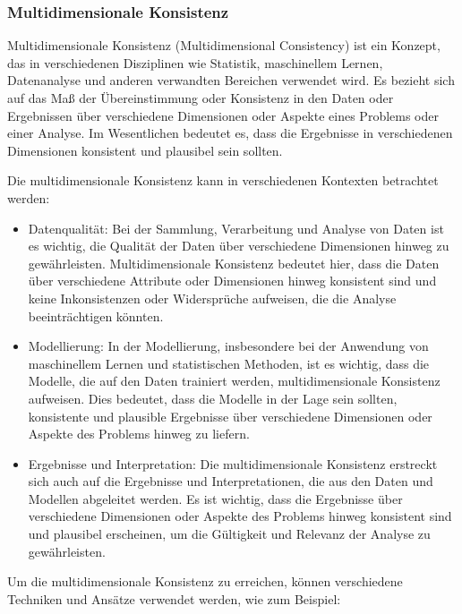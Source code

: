 \subsubsection{Multidimensionale Konsistenz }

Multidimensionale Konsistenz (Multidimensional Consistency) ist ein Konzept, das in verschiedenen Disziplinen wie Statistik, maschinellem Lernen, Datenanalyse und anderen verwandten Bereichen verwendet wird. Es bezieht sich auf das Maß der Übereinstimmung oder Konsistenz in den Daten oder Ergebnissen über verschiedene Dimensionen oder Aspekte eines Problems oder einer Analyse. Im Wesentlichen bedeutet es, dass die Ergebnisse in verschiedenen Dimensionen konsistent und plausibel sein sollten.

Die multidimensionale Konsistenz kann in verschiedenen Kontexten betrachtet werden:
\begin{itemize}
\item Datenqualität: Bei der Sammlung, Verarbeitung und Analyse von Daten ist es wichtig, die Qualität der Daten über verschiedene Dimensionen hinweg zu gewährleisten. Multidimensionale Konsistenz bedeutet hier, dass die Daten über verschiedene Attribute oder Dimensionen hinweg konsistent sind und keine Inkonsistenzen oder Widersprüche aufweisen, die die Analyse beeinträchtigen könnten.

\item Modellierung: In der Modellierung, insbesondere bei der Anwendung von maschinellem Lernen und statistischen Methoden, ist es wichtig, dass die Modelle, die auf den Daten trainiert werden, multidimensionale Konsistenz aufweisen. Dies bedeutet, dass die Modelle in der Lage sein sollten, konsistente und plausible Ergebnisse über verschiedene Dimensionen oder Aspekte des Problems hinweg zu liefern.

\item Ergebnisse und Interpretation: Die multidimensionale Konsistenz erstreckt sich auch auf die Ergebnisse und Interpretationen, die aus den Daten und Modellen abgeleitet werden. Es ist wichtig, dass die Ergebnisse über verschiedene Dimensionen oder Aspekte des Problems hinweg konsistent sind und plausibel erscheinen, um die Gültigkeit und Relevanz der Analyse zu gewährleisten.
\end{itemize}
Um die multidimensionale Konsistenz zu erreichen, können verschiedene Techniken und Ansätze verwendet werden, wie zum Beispiel:
